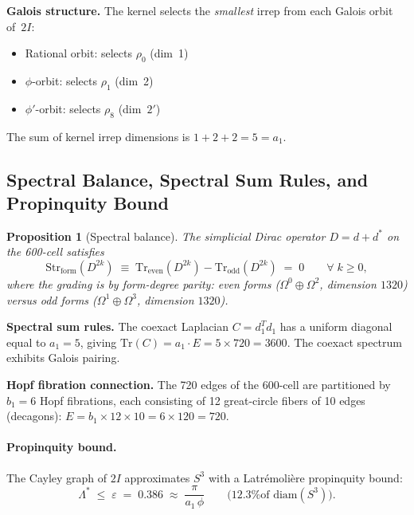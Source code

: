 \documentclass[12pt,a4paper]{article}
\newtheorem{proposition}{Proposition}
\theoremstyle{definition}
\begin{document}
\textbf{Galois structure.}  The kernel selects the \emph{smallest} irrep from each Galois orbit of~$2I$:
\begin{itemize}
\item Rational orbit: selects $\rho_0$ (dim~1)
\item $\phi$-orbit: selects $\rho_1$ (dim~2)
\item $\phi'$-orbit: selects $\rho_8$ (dim~$2'$)
\end{itemize}
The sum of kernel irrep dimensions is $1 + 2 + 2 = 5 = a_1$.

\subsection{Spectral Balance, Spectral Sum Rules, and Propinquity Bound}

\begin{proposition}[Spectral balance]\label{prop:S-spectral-balance}
The simplicial Dirac operator $D = d + d^*$ on the 600-cell satisfies
\begin{equation}
\mathrm{Str}_{\mathrm{form}}(D^{2k}) \;\equiv\; \mathrm{Tr}_{\mathrm{even}}(D^{2k}) - \mathrm{Tr}_{\mathrm{odd}}(D^{2k}) \;=\; 0 \qquad \forall\; k \geq 0,
\end{equation}
where the grading is by form-degree parity: even forms ($\Omega^0 \oplus \Omega^2$, dimension $1320$) versus odd forms ($\Omega^1 \oplus \Omega^3$, dimension $1320$).
\end{proposition}

\textbf{Spectral sum rules.}  The coexact Laplacian $C = d_1^T d_1$ has a uniform diagonal equal to $a_1 = 5$, giving $\text{Tr}(C) = a_1 \cdot E = 5 \times 720 = 3600$.  The coexact spectrum exhibits Galois pairing.

\textbf{Hopf fibration connection.}  The 720 edges of the 600-cell are partitioned by $b_1 = 6$ Hopf fibrations, each consisting of 12 great-circle fibers of 10 edges (decagons):
$E = b_1 \times 12 \times 10 = 6 \times 120 = 720$.

\paragraph{Propinquity bound.}
The Cayley graph of $2I$ approximates $S^3$ with a Latr\'emoli\`ere propinquity bound:
\begin{equation}
\Lambda^* \;\leq\; \varepsilon \;=\; 0.386 \;\approx\; \frac{\pi}{a_1\,\phi} \qquad \text{(12.3\% of $\mathrm{diam}(S^3)$)}.
\end{equation}
\end{document}
